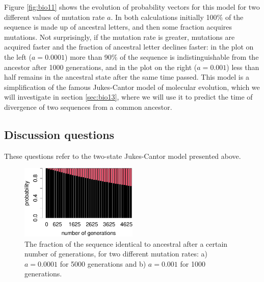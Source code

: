 \documentclass[
  letterpaper,
  DIV=11,
  numbers=noendperiod]{scrreprt}
\begin{document}
Figure \ref{fig:bio11} shows the evolution of probability vectors for
this model for two different values of mutation rate \(a\). In both
calculations initially 100\% of the sequence is made up of ancestral
letters, and then some fraction acquires mutations. Not surprisingly, if
the mutation rate is greater, mutations are acquired faster and the
fraction of ancestral letter declines faster: in the plot on the left
(\(a=0.0001\)) more than 90\% of the sequence is indistinguishable from
the ancestor after 1000 generations, and in the plot on the right
(\(a=0.001\)) less than half remains in the ancestral state after the
same time passed. This model is a simplification of the famous
Jukes-Cantor model of molecular evolution, which we will investigate in
section \ref{sec:bio13}, where we will use it to predict the time of
divergence of two sequences from a common ancestor.

\hypertarget{discussion-questions-4}{%
\subsection{Discussion questions}\label{discussion-questions-4}}

These questions refer to the two-state Jukes-Cantor model presented
above.

\begin{figure}

{\centering \includegraphics[width=0.5\textwidth,height=\textheight]{./markov_evol_files/figure-pdf/bio11-1.pdf}

}

\caption{The fraction of the sequence identical to ancestral after a
certain number of generations, for two different mutation rates: a)
\(a=0.0001\) for 5000 generations and b) \(a=0.001\) for 1000
generations.}

\end{figure}
\end{document}
